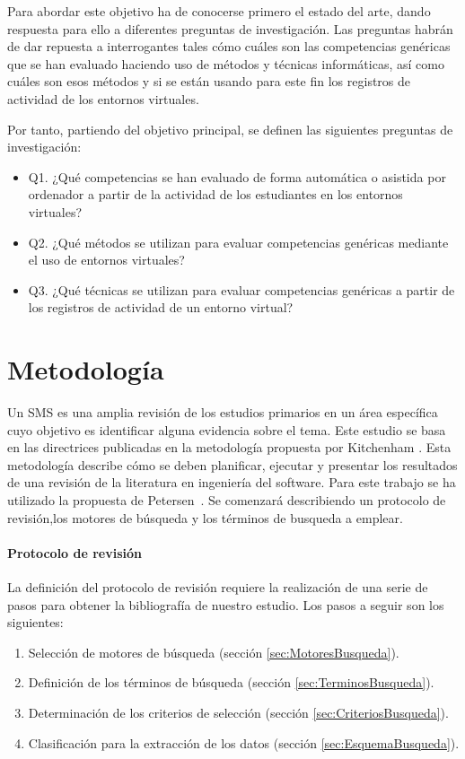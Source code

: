 Para abordar este objetivo ha de conocerse primero el estado del arte, dando respuesta para ello a diferentes preguntas de investigación. Las preguntas habrán de dar repuesta a interrogantes tales cómo cuáles son las competencias genéricas que se han evaluado haciendo uso de métodos y técnicas informáticas, así como cuáles son esos métodos y si se están usando para este fin los registros de actividad de los entornos virtuales.

\bigskip
Por tanto, partiendo del objetivo principal, se definen las siguientes preguntas de investigación:
\begin{itemize}
\item Q1. ¿Qué competencias se han evaluado de forma automática o asistida por ordenador a partir de la actividad de los estudiantes en los entornos virtuales?
\item Q2. ¿Qué métodos se utilizan para evaluar competencias genéricas mediante el uso de entornos virtuales?
\item Q3. ¿Qué técnicas se utilizan para evaluar competencias genéricas a partir de los registros de actividad de un entorno virtual?
\end{itemize}

\section{Metodología}

Un SMS es una amplia revisión de los estudios primarios en un área específica cuyo objetivo es identificar alguna evidencia sobre el tema. Este estudio se basa en las directrices publicadas en la metodología propuesta por Kitchenham \cite{Kitchenham:2010}. Esta metodología describe cómo se deben planificar, ejecutar y presentar los resultados de una revisión de la literatura en ingeniería del software. Para este trabajo se ha utilizado la propuesta de Petersen~\cite{Petersen:2008}. Se comenzará describiendo un protocolo de revisión,los motores de búsqueda y los términos de busqueda a emplear.

\paragraph*{Protocolo de revisión}
La definición del protocolo de revisión requiere la realización de una serie de pasos para obtener la bibliografía de nuestro estudio. Los pasos a seguir son los siguientes:
\begin{enumerate}
\item Selección de motores de búsqueda (sección \ref{sec:MotoresBusqueda}).
\item Definición de los términos de búsqueda (sección \ref{sec:TerminosBusqueda}).
\item Determinación de los criterios de selección (sección \ref{sec:CriteriosBusqueda}).
\item Clasificación para la extracción de los datos (sección \ref{sec:EsquemaBusqueda}).
\end{enumerate}

